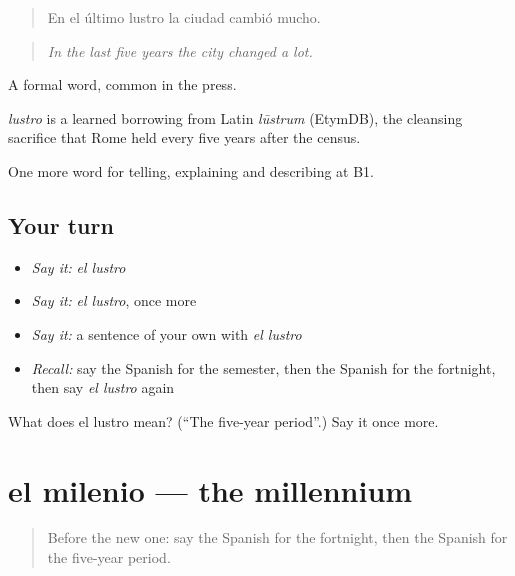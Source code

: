 \begin{quote}
En el último lustro la ciudad cambió mucho.
\end{quote}

\begin{quote}
\emph{In the last five years the city changed a lot.}
\end{quote}

A formal word, common in the press.

\begin{cousinweb}
\emph{lustro} is a learned borrowing from Latin \emph{lūstrum} (EtymDB), the cleansing sacrifice that Rome held every five years after the census.
\end{cousinweb}

\begin{grammarlens}[title={What you've built}]
One more word for telling, explaining and describing at B1.
\end{grammarlens}

\subsection*{Your turn}
\begin{itemize}
\raggedright
  \item \emph{Say it:} \emph{el lustro}
  \item \emph{Say it:} \emph{el lustro}, once more
  \item \emph{Say it:} a sentence of your own with \emph{el lustro}
  \item \emph{Recall:} say the Spanish for the semester, then the Spanish for the fortnight, then say \emph{el lustro} again
\end{itemize}

\begin{tcolorbox}[breakable,colback=teal!4,colframe=teal!35!black,title={Before you move on}]
What does el lustro mean? (\textquotedblleft{}The five-year period\textquotedblright{}.) Say it once more.
\end{tcolorbox}
\section[el milenio]{el milenio — the millennium}

\label{lesson:ES-C539-milenio}



\begin{quote}
Before the new one: say the Spanish for the fortnight, then the Spanish for the five-year period.
\end{quote}

